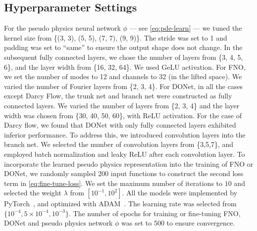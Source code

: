 \subsection{Hyperparameter Settings}\label{sect:appendix:methods} 
For the pseudo physics neural network $\phi$ --- see \eqref{eq:pde-learn} --- we tuned the kernel size from \{(3, 3), (5, 5), (7, 7), (9, 9)\}. The stride was set to 1 and padding was set to ``same'' to ensure the output shape does not change. In the subsequent fully connected layers, we chose the number of layers from \{3, 4, 5, 6\}, and the layer width from \{16, 32, 64\}. We used {GeLU} activation. %
For FNO, we set the number of modes to 12 and channels to 32 (in the lifted space). We varied the number of Fourier layers from \{2, 3, 4\}. For DONet, in all the cases except Darcy Flow,  the trunk net and branch net were constructed as fully connected layers. We varied the number of layers from \{2, 3, 4\} and the layer width was chosen from \{30, 40, 50, 60\}, with ReLU activation. For the case of Darcy flow, we found that DONet with only fully connected layers exhibited inferior performance. To address this, we introduced convolution layers into the branch net. We selected the number of convolution layers from \{3,5,7\}, and employed batch normalization and leaky ReLU after each convolution layer.
To incorporate the learned pseudo physics representation into the training of FNO or DONet,  we randomly sampled 200 input functions to construct the second loss term in  \eqref{eq:fine-tune-loss}. 
We set the maximum number of iterations to $10$ and selected the weight $\lambda$ from $[10^{-1}, 10^{2}]$. 
All the models were implemented by PyTorch~\citep{paszke2019pytorch}, and optimized with ADAM~\citep{kingma2014adam}. The learning rate was selected from $\{10^{-4}, 5\times 10^{-4}, 10^{-3}\}$. The number of epochs for training or fine-tuning FNO, DONet and pseudo physics network $\phi$ was set to 500 to ensure convergence. 


